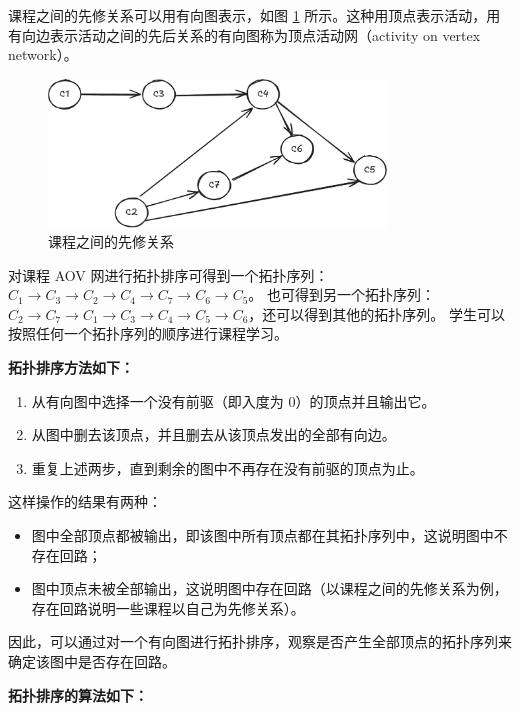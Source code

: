 \documentclass[lang=cn,newtx,10pt,scheme=chinese]{elegantbook}
\begin{document}
课程之间的先修关系可以用有向图表示，如图 \ref{fig:course} 所示。这种用顶点表示活动，用有向边表示活动之间的先后关系的有向图称为顶点活动网（activity on vertex network）。

\begin{figure}[h!]
  \centering
  \includegraphics[width=0.8\textwidth]{./figure/pdf/cropped/toposort.pdf}
  \caption{课程之间的先修关系}
  \label{fig:course}
\end{figure}

对课程 AOV 网进行拓扑排序可得到一个拓扑序列：$C_1 \to C_3 \to C_2 \to C_4 \to C_7 \to C_6 \to C_5$。  
也可得到另一个拓扑序列：$C_2 \to C_7 \to C_1 \to C_3 \to C_4 \to C_5 \to C_6$，还可以得到其他的拓扑序列。  
学生可以按照任何一个拓扑序列的顺序进行课程学习。

\textbf{拓扑排序方法如下：}

\begin{enumerate}
  \item 从有向图中选择一个没有前驱（即入度为 $0$）的顶点并且输出它。
  \item 从图中删去该顶点，并且删去从该顶点发出的全部有向边。
  \item 重复上述两步，直到剩余的图中不再存在没有前驱的顶点为止。
\end{enumerate}

这样操作的结果有两种：
\begin{itemize}
  \item 图中全部顶点都被输出，即该图中所有顶点都在其拓扑序列中，这说明图中不存在回路；
  \item 图中顶点未被全部输出，这说明图中存在回路（以课程之间的先修关系为例，存在回路说明一些课程以自己为先修关系）。
\end{itemize}

因此，可以通过对一个有向图进行拓扑排序，观察是否产生全部顶点的拓扑序列来确定该图中是否存在回路。

\textbf{拓扑排序的算法如下：}
\end{document}
